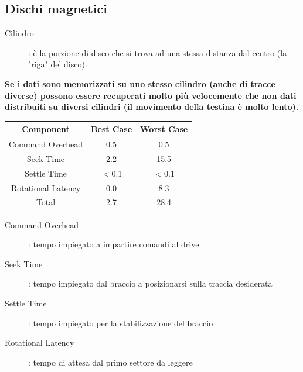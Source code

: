 \documentclass[12pt]{article}
\begin{document}
\subsection{Dischi magnetici}
\begin{description}
    \item[Cilindro]: è la porzione di disco che si trova ad una stessa distanza dal centro (la "riga" del disco). 
\end{description}
\textbf{Se i dati sono memorizzati su uno stesso cilindro (anche di tracce diverse) possono essere recuperati molto più velocemente che non dati distribuiti su diversi cilindri (il movimento della testina è molto lento).}
\begin{center}
    \begin{tabular}{| c | c | c |}
        \hline
        \textbf{Component} & \textbf{Best Case} & \textbf{Worst Case} \\ 
        \hline
        Command Overhead & 0.5 & 0.5 \\ %
        \hline
        Seek Time & 2.2 & 15.5 \\ %
        \hline
        Settle Time & $<$0.1 & $<$0.1 \\ %
        \hline
        Rotational Latency & 0.0 & 8.3 \\ %
        \hline
        Total & 2.7 & 28.4 \\
        \hline
    \end{tabular}    
\end{center}
\begin{description}
    \item[Command Overhead]: tempo impiegato a impartire comandi al drive
    \item[Seek Time]: tempo impiegato dal braccio a posizionarsi sulla traccia desiderata
    \item[Settle Time]: tempo impiegato per la stabilizzazione del braccio
    \item[Rotational Latency]: tempo di attesa dal primo settore da leggere
\end{description}
\end{document}
